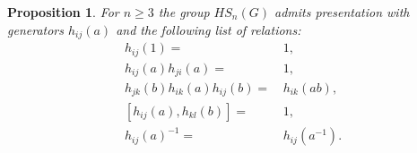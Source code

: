 \documentclass[oneside, 10pt]{amsart}
\theoremstyle{plain}
\numberwithin{equation}{section}
\numberwithin{lemma}{section}
\newtheorem{prop}[lemma]{Proposition}
\theoremstyle{remark}
\theoremstyle{definition}
\begin{document}
\begin{prop} \label{prop:HSpres} For $n\geq 3$ the group $HS_n(G)$ admits presentation with generators $h_{ij}(a)$ and the following list of relations:
\begin{align}
h_{ij}(1)                     = &\, 1,              \tag{R0} \label{H0} \\
h_{ij}(a) h_{ji}(a)           = &\, 1,              \tag{R1} \label{H1} \\
h_{jk}(b) h_{ik}(a) h_{ij}(b) = &\, h_{ik}(ab),     \tag{R2} \label{H2} \\
[h_{ij}(a), h_{kl}(b)]        = &\, 1,              \tag{R3} \label{H3} \\
h_{ij}(a)^{-1}                = &\, h_{ij}(a^{-1}). \tag{R4} \label{H4}
\end{align}
\end{prop}
\end{document}

